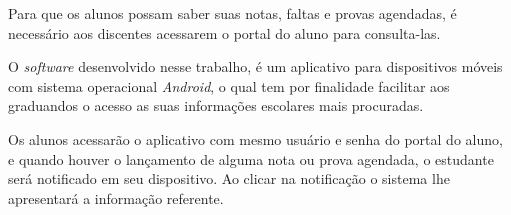 
	\par Para que os alunos possam saber suas notas, faltas e provas agendadas,
é necessário aos discentes acessarem o portal do aluno para consulta-las.

	\par O \textit{software} desenvolvido nesse trabalho, é um aplicativo para
dispositivos móveis com sistema operacional \textit{Android}, o qual tem por
finalidade facilitar aos graduandos o acesso as suas informações escolares mais
procuradas.
	
	\par Os alunos acessarão o aplicativo com mesmo usuário e senha do
portal do aluno, e quando houver o lançamento de alguma nota ou prova agendada,
o estudante será notificado em seu dispositivo. Ao clicar na notificação
o sistema lhe apresentará a informação referente. 